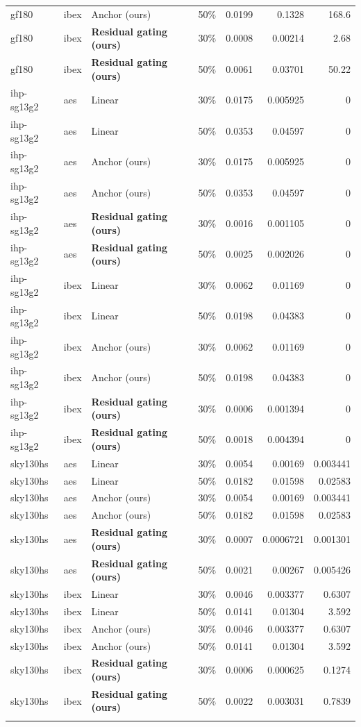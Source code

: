 \begin{tabular}{lllrrrr}
gf180 & ibex & Anchor (ours) & 50\% & 0.0199 & 0.1328 & 168.6 \\
gf180 & ibex & \textbf{Residual gating (ours)} & 30\% & 0.0008 & 0.00214 & 2.68 \\
gf180 & ibex & \textbf{Residual gating (ours)} & 50\% & 0.0061 & 0.03701 & 50.22 \\
\addlinespace
\midrule
ihp-sg13g2 & aes & Linear & 30\% & 0.0175 & 0.005925 & 0 \\
ihp-sg13g2 & aes & Linear & 50\% & 0.0353 & 0.04597 & 0 \\
ihp-sg13g2 & aes & Anchor (ours) & 30\% & 0.0175 & 0.005925 & 0 \\
ihp-sg13g2 & aes & Anchor (ours) & 50\% & 0.0353 & 0.04597 & 0 \\
ihp-sg13g2 & aes & \textbf{Residual gating (ours)} & 30\% & 0.0016 & 0.001105 & 0 \\
ihp-sg13g2 & aes & \textbf{Residual gating (ours)} & 50\% & 0.0025 & 0.002026 & 0 \\
\addlinespace
ihp-sg13g2 & ibex & Linear & 30\% & 0.0062 & 0.01169 & 0 \\
ihp-sg13g2 & ibex & Linear & 50\% & 0.0198 & 0.04383 & 0 \\
ihp-sg13g2 & ibex & Anchor (ours) & 30\% & 0.0062 & 0.01169 & 0 \\
ihp-sg13g2 & ibex & Anchor (ours) & 50\% & 0.0198 & 0.04383 & 0 \\
ihp-sg13g2 & ibex & \textbf{Residual gating (ours)} & 30\% & 0.0006 & 0.001394 & 0 \\
ihp-sg13g2 & ibex & \textbf{Residual gating (ours)} & 50\% & 0.0018 & 0.004394 & 0 \\
\addlinespace
\midrule
sky130hs & aes & Linear & 30\% & 0.0054 & 0.00169 & 0.003441 \\
sky130hs & aes & Linear & 50\% & 0.0182 & 0.01598 & 0.02583 \\
sky130hs & aes & Anchor (ours) & 30\% & 0.0054 & 0.00169 & 0.003441 \\
sky130hs & aes & Anchor (ours) & 50\% & 0.0182 & 0.01598 & 0.02583 \\
sky130hs & aes & \textbf{Residual gating (ours)} & 30\% & 0.0007 & 0.0006721 & 0.001301 \\
sky130hs & aes & \textbf{Residual gating (ours)} & 50\% & 0.0021 & 0.00267 & 0.005426 \\
\addlinespace
sky130hs & ibex & Linear & 30\% & 0.0046 & 0.003377 & 0.6307 \\
sky130hs & ibex & Linear & 50\% & 0.0141 & 0.01304 & 3.592 \\
sky130hs & ibex & Anchor (ours) & 30\% & 0.0046 & 0.003377 & 0.6307 \\
sky130hs & ibex & Anchor (ours) & 50\% & 0.0141 & 0.01304 & 3.592 \\
sky130hs & ibex & \textbf{Residual gating (ours)} & 30\% & 0.0006 & 0.000625 & 0.1274 \\
sky130hs & ibex & \textbf{Residual gating (ours)} & 50\% & 0.0022 & 0.003031 & 0.7839 \\
\addlinespace
\bottomrule\end{tabular}
